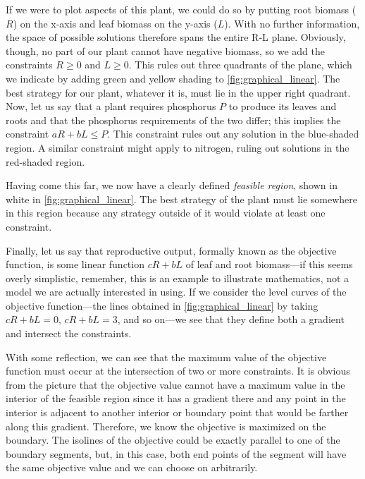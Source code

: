 \documentclass{article}
\begin{document}
If we were to plot aspects of this plant, we could do so by putting root biomass ($R$) on the x-axis and leaf biomass on the y-axis ($L$). With no further information, the space of possible solutions therefore spans the entire R-L plane. Obviously, though, no part of our plant cannot have negative biomass, so we add the constraints $R\ge0$ and $L\ge0$. This rules out three quadrants of the plane, which we indicate by adding green and yellow shading to \autoref{fig:graphical_linear}. The best strategy for our plant, whatever it is, must lie in the upper right quadrant. Now, let us say that a plant requires phosphorus $P$ to produce its leaves and roots and that the phosphorus requirements of the two differ; this implies the constraint $aR+bL\le P$. This constraint rules out any solution in the blue-shaded region. A similar constraint might apply to nitrogen, ruling out solutions in the red-shaded region.

Having come this far, we now have a clearly defined \textit{feasible region}, shown in white in \autoref{fig:graphical_linear}. The best strategy of the plant must lie somewhere in this region because any strategy outside of it would violate at least one constraint.

Finally, let us say that reproductive output, formally known as the objective function, is some linear function $cR+bL$ of leaf and root biomass---if this seems overly simplistic, remember, this is an example to illustrate mathematics, not a model we are actually interested in using. If we consider the level curves of the objective function---the lines obtained in \autoref{fig:graphical_linear} by taking $cR+bL=0$, $cR+bL=3$, and so on---we see that they define both a gradient and intersect the constraints.

With some reflection, we can see that the maximum value of the objective function must occur at the intersection of two or more constraints. It is obvious from the picture that the objective value cannot have a maximum value in the interior of the feasible region since it has a gradient there and any point in the interior is adjacent to another interior or boundary point that would be farther along this gradient. Therefore, we know the objective is maximized on the boundary. The isolines of the objective could be exactly parallel to one of the boundary segments, but, in this case, both end points of the segment will have the same objective value and we can choose on arbitrarily.
\end{document}

